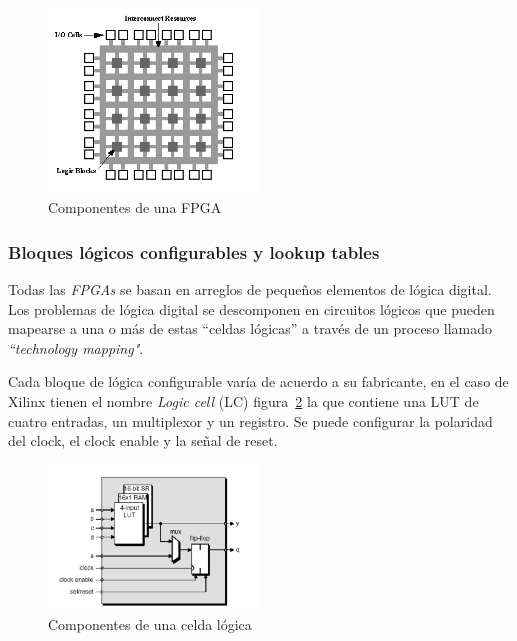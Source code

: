 \begin{figure}[h!]
\begin{center}
\includegraphics[width=0.5\textwidth,keepaspectratio=true]{./images/fpga1a}
\caption{Componentes de una FPGA}
\label{fig:compfpga}
\end{center}
\end{figure}

	
\subsubsection{Bloques lógicos configurables y lookup tables}

Todas las \textit{FPGAs} se basan en arreglos de pequeños elementos de
lógica digital. Los problemas de lógica digital se descomponen en
circuitos lógicos que pueden mapearse a una o más de estas
``celdas lógicas'' a través de un proceso llamado \textit{“technology
  mapping"}.
	
Cada bloque de lógica configurable varía de acuerdo a su fabricante,
en el caso de Xilinx tienen el nombre \textit{Logic cell} (LC) figura~\ref{fig:complc} la que contiene una LUT de cuatro entradas, un multiplexor
y un registro. Se puede configurar la polaridad del clock, el clock
enable y la señal de reset.

\begin{figure}[h!]
\begin{center}
\includegraphics[width=0.5\textwidth,keepaspectratio=true]{./images/celda}
\caption{Componentes de una celda lógica}
\label{fig:complc}
\end{center}
\end{figure}

